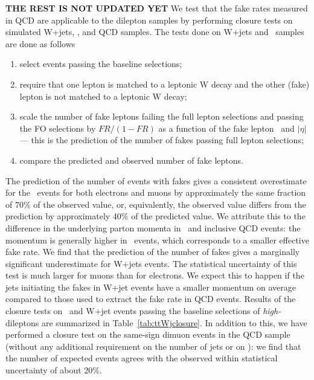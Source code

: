 {\bf THE REST IS NOT UPDATED YET}
We test that the fake rates measured in QCD are applicable to the dilepton samples by performing closure
tests on simulated W+jets, \ttbar, and QCD samples.
The tests done on W+jets and \ttbar\ samples are done as follows
\begin{enumerate}
\item select events passing the baseline selections;
\item require that one lepton is matched to a leptonic W decay and the other (fake) lepton is not
matched to a leptonic W decay;
\item scale the number of fake leptons failing the full lepton selections and passing the FO selections
	by $FR/(1-FR)$ as a function of the fake lepton \pt\ and $|\eta|$ --- this is the prediction
	of the number of fakes passing full lepton selections;
\item compare the predicted and observed number of fake leptons.
\end{enumerate}
The prediction of the number of events with fakes gives a consistent overestimate for the \ttbar\ events
for both electrons and muons by approximately the same fraction of  $70\%$ of the observed value,
or, equivalently, the observed value differs from the prediction by approximately  40\% of the predicted value.
We attribute this to the difference in the underlying parton momenta in \ttbar\ and inclusive QCD events:
the momentum is generally higher in \ttbar\ events, which corresponds to a smaller effective fake rate.
We find that the prediction of the number of fakes gives a marginally significant underestimate 
for W+jets events.
The statistical uncertainty of this test  is much larger for muons than for electrons.
We expect this to happen if the jets initiating the fakes in W+jet events have a smaller momentum on average
compared to those used to extract the fake rate in QCD events.
Results of the closure tests on \ttbar\ and W+jet events passing the baseline selections of {\em high-\pt}
 dileptons are summarized in Table~\ref{tab:ttWjclosure}.
In addition to this, we have performed a closure test on the same-sign dimuon events in the QCD sample
(without any additional requirement on the number of jets or on \met):
we find that the number of expected events agrees with the  observed within statistical uncertainty of about 20\%.

